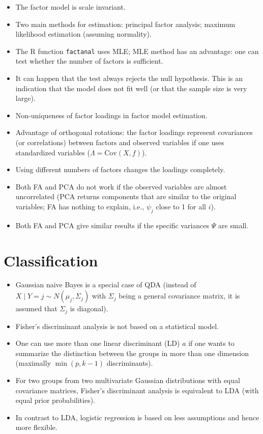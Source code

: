 \documentclass[a4paper]{article}
\begin{document}
\begin{itemize}
    \item The factor model is scale invariant.
    \item Two main methods for estimation: principal factor analysis; maximum likelihood estimation (assuming normality).
    \item The R function \texttt{factanal} uses MLE; MLE method has an advantage: one can test whether the number of factors is sufficient.
    \item It can happen that the test always rejects the null hypothesis. This is an indication that the model does not fit well (or that the sample size is very large).
    \item Non-uniqueness of factor loadings in factor model estimation.
    \item Advantage of orthogonal rotations: the factor loadings represent covariances (or correlations) between factors and observed variables if one uses standardized variables ($\Lambda=\text{Cov}(X,f)$).
    \item Using different numbers of factors changes the loadings completely.
    \item Both FA and PCA do not work if the observed variables are almost uncorrelated (PCA returns components that are similar to the original variables; FA has nothing to explain, i.e., $\psi_j$ close to 1 for all $i$).
    \item Both FA and PCA give similar results if the specific variances $\Psi$ are small.
\end{itemize}

\section{Classification}

\begin{itemize}
    \item Gaussian naive Bayes is a special case of QDA (instead of $X\mid Y=j\sim N(\mu_j,\Sigma_j)$ with $\Sigma_j$ being a general covariance matrix, it is assumed that $\Sigma_j$ is diagonal).
    \item Fisher's discriminant analysis is not based on a statistical model.
    \item One can use more than one linear discriminant (LD) $a$ if one wants to summarize the distinction between the groups in more than one dimension (maximally $\min(p,k-1)$ discriminants).
    \item For two groups from two multivariate Gaussian distributions with equal covariance matrices, Fisher's discriminant analysis is equivalent to LDA (with equal prior probabilities).
    \item In contrast to LDA, logistic regression is based on less assumptions and hence more flexible.
\end{itemize}
\end{document}
